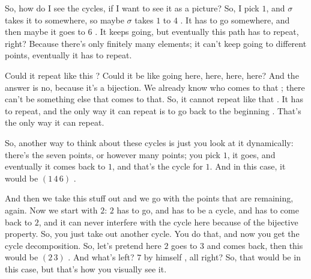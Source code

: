 \begin{speech}[00:29:43 - 00:31:21]
So, how do I see the cycles, if I want to see it as a picture? So, I pick $1$, and $\sigma$ takes it to somewhere, so maybe $\sigma$ takes $1$ to $4$ . It has to go somewhere, and then maybe it goes to $6$ . It keeps going, but eventually this path has to repeat, right? Because there's only finitely many elements; it can't keep going to different points, eventually it has to repeat.

Could it repeat like this ? Could it be like going here, here, here, here? And the answer is no, because it's a bijection. We already know who comes to that ; there can't be something else that comes to that. So, it cannot repeat like that . It has to repeat, and the only way it can repeat is to go back to the beginning . That's the only way it can repeat.

So, another way to think about these cycles is just you look at it dynamically: there's the seven points, or however many points; you pick $1$, it goes, and eventually it comes back to $1$, and that's the cycle for $1$. And in this case, it would be $(1\,4\,6)$ .

And then we take this stuff out and we go with the points that are remaining, again. Now we start with $2$: $2$ has to go, and has to be a cycle, and has to come back to $2$, and it can never interfere with the cycle here because of the bijective property. So, you just take out another cycle. You do that, and now you get the cycle decomposition. So, let's pretend here $2$ goes to $3$ and comes back, then this would be $(2\,3)$ . And what's left? $7$ by himself , all right? So, that would be in this case, but that's how you visually see it.
\end{speech}

